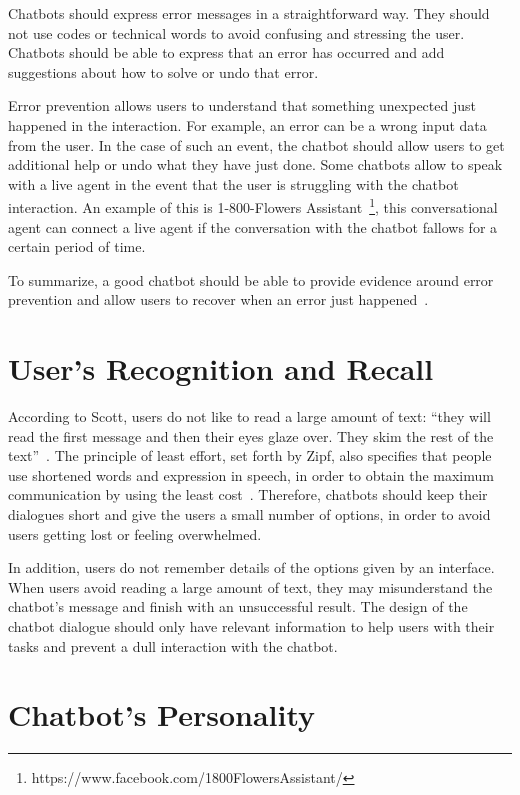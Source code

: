 \documentclass[a4paper,10pt]{article}
\begin{document}
Chatbots should express error messages in a straightforward way. They should not use codes or technical words to avoid confusing and stressing the user. Chatbots should be able to express that an error has occurred and add suggestions about how to solve or undo that error. 

Error prevention allows users to understand that something unexpected just happened in the interaction. For example, an error can be a wrong input data from the user. In the case of such an event, the chatbot should allow users to get additional help or undo what they have just done. Some chatbots  allow to speak with a live agent in the event that the user is struggling with the chatbot interaction. An example of this is 1-800-Flowers Assistant~\footnote{https://www.facebook.com/1800FlowersAssistant/}, this conversational agent can connect a live agent if the conversation with the chatbot fallows for a certain period of time. 

To summarize, a good chatbot should be able to provide evidence around error prevention and allow users to recover when an error just happened~\cite{HeuristicsWebPage}. 

\section{User's Recognition and Recall}

According to Scott, users do not like to read a large amount of text: ``they will read the first message and then their eyes glaze over. They skim the rest of the text”~\cite{HeuristicsWebPage}. The principle of least effort, set forth by Zipf, also specifies that people use shortened words and expression in speech, in order to obtain the maximum communication by using the least cost~\cite{zipf2016human}. Therefore, chatbots should keep their dialogues short and give the users a small number of options, in order to avoid users getting lost or feeling overwhelmed.

In addition, users do not remember details of the options given by an interface. When users avoid reading a large amount of text, they may misunderstand the chatbot’s message and finish with an unsuccessful result. The design of the chatbot dialogue should only have relevant information to help users with their tasks and prevent a dull interaction with the chatbot. 

\section{Chatbot's Personality}
\end{document}
